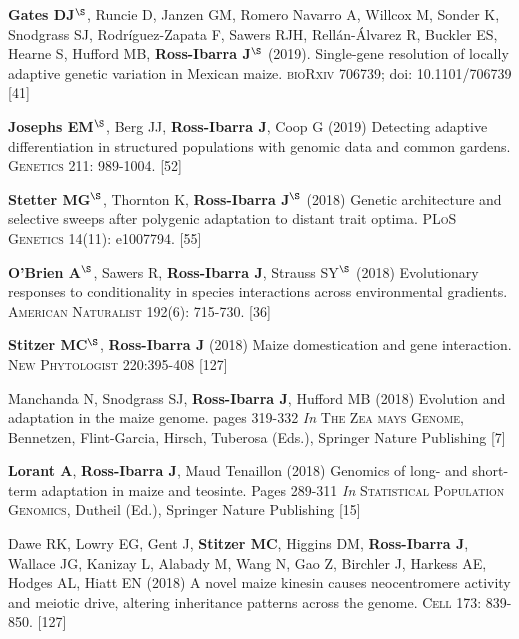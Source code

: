 \documentclass[letterpaper,10pt]{article}
\begin{document}
\begin{etaremune}
\item \textbf{Gates DJ}$^\S$, Runcie D, Janzen GM, Romero Navarro A,  Willcox M,  Sonder K, Snodgrass SJ, Rodr\'{i}guez-Zapata F,  Sawers RJH,  Rell\'{a}n-\'{A}lvarez R, Buckler ES, Hearne S, Hufford MB, \textbf{Ross-Ibarra J}$^\S$ (2019). Single-gene resolution of locally adaptive genetic variation in Mexican maize. \textsc{bioRxiv} 706739; doi: 10.1101/706739
 [41]\\

\item \textbf{Josephs EM}$^\S$, Berg JJ, \textbf{Ross-Ibarra J}, Coop G (2019) Detecting adaptive differentiation in structured populations with genomic data and common gardens. \textsc{Genetics} 211: 989-1004.
 [52]\\

\item \textbf{Stetter MG}$^\S$, Thornton K, \textbf{Ross-Ibarra J}$^\S$ (2018) Genetic architecture and selective sweeps after polygenic adaptation to distant trait optima. \textsc{PLoS Genetics} 14(11): e1007794. %
 [55]\\

\item \textbf{O'Brien A}$^\S$, Sawers R, \textbf{Ross-Ibarra J}, Strauss  SY$^\S$ (2018) Evolutionary responses to conditionality in species interactions across environmental gradients. \textsc{American Naturalist} 192(6): 715-730.
 [36]\\

\item \textbf{Stitzer MC}$^\S$, \textbf{Ross-Ibarra J} (2018) Maize domestication and gene interaction. \textsc{New Phytologist} 220:395-408
 [127]\\

\item Manchanda N, Snodgrass SJ, \textbf{Ross-Ibarra J}, Hufford MB (2018) Evolution and adaptation in the maize genome. pages 319-332 \textit{In} \textsc{The Zea mays Genome}, Bennetzen, Flint-Garcia, Hirsch, Tuberosa (Eds.), Springer Nature Publishing 
 [7]\\

\item \textbf{Lorant A}, \textbf{Ross-Ibarra J}, Maud Tenaillon (2018) Genomics of long- and short- term adaptation in maize and teosinte. Pages 289-311 \textit{In} \textsc{Statistical Population Genomics},  Dutheil (Ed.), Springer Nature Publishing 
 [15]\\

\item Dawe RK, Lowry EG, Gent J, \textbf{Stitzer MC}, Higgins DM, \textbf{Ross-Ibarra J}, Wallace JG, Kanizay L, Alabady M, Wang N, Gao Z, Birchler J, Harkess AE, Hodges AL, Hiatt EN (2018) A novel maize kinesin causes neocentromere activity and meiotic drive, altering inheritance patterns across the genome. \textsc{Cell} 173: 839-850.
 [127]\\


\end{etaremune}
\end{document}
